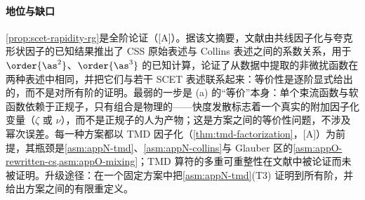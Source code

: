\paragraph{地位与缺口}
\cref{prop:scet-rapidity-rg}是全阶论证（[A]）。据该文摘要，文献\cite{Collins:2017oxh}由共线因子化与夸克形状因子的已知结果推出了 CSS 原始表述与 Collins 表述之间的系数关系，用于 $\order{\as^2}$、$\order{\as^3}$ 的已知计算，论证了从数据中提取的非微扰函数在两种表述中相同，并把它们与若干 SCET 表述联系起来：等价性是逐阶显式给出的，而不是对所有阶的证明。最弱的一步是 (a) 的“等价”本身：单个束流函数与软函数依赖于正规子，只有组合是物理的——快度发散标志着一个真实的附加因子化变量（$\zeta$ 或 $\nu$），而不是正规子的人为产物；这是方案之间的等价性问题，不涉及幂次误差。每一种方案都以 TMD 因子化（\cref{thm:tmd-factorization}，[A]）为前提，其瓶颈是\cref{asm:appN-tmd}、\cref{asm:appN-collins}与 Glauber 区的\cref{asm:appO-rewritten-cs,asm:appO-mixing}；TMD 算符的多重可重整性在文献中被论证而未被证明\cite[第~13~章]{Collins2011}。升级途径：在一个固定方案中把\cref{asm:appN-tmd}(T3) 证明到所有阶，并给出方案之间的有限重定义。
